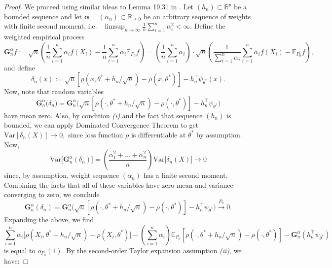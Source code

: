 \documentclass[11pt, oneside]{amsart}
\theoremstyle{definition}   %
\newcommand{\E}{\mathbb{E}}
\newcommand{\R}{\mathbb{R}}
\newcommand{\loss}{\rho}
\begin{document}
\begin{proof}
    We proceed using similar ideas to Lemma 19.31 in \cite{Vaart_1998}. Let \( (h_n) \subset \mathbb{R}^p \) be a bounded sequence and let \( \boldsymbol{\alpha} = (\alpha_n) \subset \R_{\geq 0} \) be an arbitrary sequence of weights with finite second moment, i.e.\
    $\limsup_{n \rightarrow \infty} \frac{1}{n}\sum_{i=1}^n \alpha_i^2 < \infty.$
    Define the weighted empirical process
    \[
    \textbf{G}_n^\alpha f := \sqrt{n} \left( \frac{1}{n} \sum_{i=1}^n \alpha_i f(X_i) - \frac{1}{n} \sum_{i=1}^n \alpha_i \E_{P_0} f \right)
    = \left( \frac{1}{n} \sum_{i=1}^n \alpha_i \right) \cdot \sqrt{n} \left( \frac{1}{\sum_{i=1}^n \alpha_i} \sum_{i=1}^n \alpha_i f(X_i) - \E_{P_0} f \right),
    \]
    and define
    \[
    \delta_n(x) := \sqrt{n} \left[ \rho(x, \theta^* + h_n/\sqrt{n}) - \rho(x, \theta^*) \right] - h_n^\top \psi_{\theta^*}(x).
    \]
    Now, note that random variables
    \[
    \textbf{G}_n^\alpha \bigl ( \delta_n \bigr) = \textbf{G}_n^\alpha \bigl ( \sqrt{n} \left[ \rho(\cdot, \theta^* + h_n/\sqrt{n}) - \rho(\cdot, \theta^*) \right] - h_n^\top \psi_{\theta^*} \bigr )
    \]
    have mean zero. Also, by condition \textit{(i)} and the fact that sequence $(h_n)$ is bounded, we can apply Dominated Convergence Theorem to get
    $
    \mathrm{Var} [ \delta_n (X) ] \rightarrow 0,
    $
    since loss function \( \loss \) is differentiable at \( \theta^* \) by assumption. Now,
    \[
    \mathrm{Var} \bigl[ \textbf{G}_n^\alpha( \delta_n ) \bigr ] =
    \left (\frac{\alpha_1 ^ 2 + \ldots + \alpha_n ^ 2}{n} \right ) \mathrm{Var} \bigl [ \delta_n (X) \bigr] \rightarrow 0
    \]
    since, by assumption, weight sequence $(\alpha_n)$ has a finite second moment. 
    Combining the facts that all of these variables have zero mean and variance converging to zero, we conclude
    \[
    \textbf{G}_n^\alpha( \delta_n ) = \textbf{G}_n^\alpha \bigl ( \sqrt{n} \left[ \rho(\cdot, \theta^* + h_n/\sqrt{n}) - \rho(\cdot, \theta^*) \right] - h_n^\top \psi_{\theta^*} \bigr ) \overset{P_0}{\rightarrow} 0.
    \]
    Expanding the above, we find
    \[
    \sum_{i=1}^n \alpha_i \bigl [ \rho(X_i, \theta^* + h_n/\sqrt{n}) - \rho(X_i, \theta^*) \bigr ] - \left( \sum_{i=1}^n \alpha_i \right) \E_{P_0} \left[ \rho(\cdot, \theta^* + h_n/\sqrt{n}) - \rho(\cdot, \theta^*) \right] - \textbf{G}_n^\alpha (h_n^\top \psi_{\theta^*})
    \]
    is equal to \(o_{P_0}(1)\).
    By the second-order Taylor expansion assumption \textit{(ii)}, we have:

\end{proof}
\end{document}
